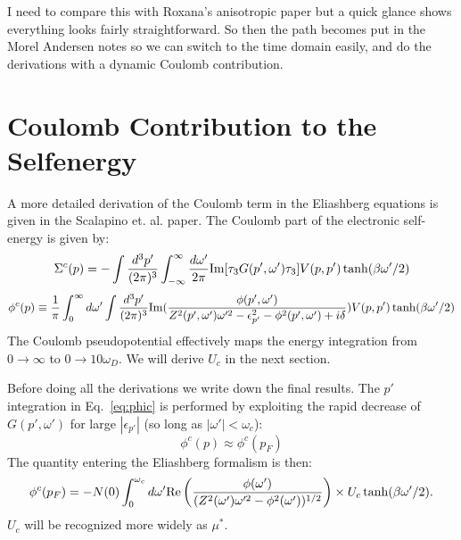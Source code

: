 I need to compare this with Roxana's anisotropic paper but a quick glance shows everything looks
fairly straightforward. So then the path becomes put in the Morel Andersen notes so we can switch
to the time domain easily, and do the derivations with a dynamic Coulomb contribution. 

\section{Coulomb Contribution to the Selfenergy}
%
A more detailed derivation of the Coulomb term in the Eliashberg equations
is given in the Scalapino et. al. paper.
%
The Coulomb part of the electronic self-energy is given by:
%
\begin{equation}
\Sigma^{c}(p) = - \int \frac{d^{3}p'}{(2\pi)^{3}}\int_{-\infty}^{\infty}\frac{d\omega'}{2\pi}{\rm Im}[\tau_{3}G(p',\omega')\tau_{3}] V(p,p')\tanh(\beta\omega'/2)
\end{equation}
%
\begin{equation}
\label{eq:phic}
\phi^{c}(p)\equiv \frac{1}{\pi}\int_{0}^{\infty}d\omega'\int\frac{d^{3}p'}{(2\pi)^{3}}
{\rm Im}(\frac{\phi(p',\omega')}{Z^{2}(p',\omega')\omega'^{2} -\epsilon^{2}_{p'}-\phi^{2}(p',\omega')+i\delta})
V(p,p') \tanh(\beta\omega'/2)
\end{equation}
%
The Coulomb pseudopotential effectively maps the energy integration from
$0\rightarrow \infty$ to $0 \rightarrow 10 \omega_{D}$. We will derive $U_{c}$ in
the next section.

Before doing all the derivations we write down the final results. The $p'$ integration in
Eq.~\ref{eq:phic} is performed by exploiting the rapid decrease of $G(p',\omega')$ 
for large $|\epsilon_{p'}|$ (so long as $|\omega'|<\omega_{c}$):
%
\begin{equation}
\phi^{c}(p) \approx \phi^{c}(p_{F})
\end{equation}
%
The quantity entering the Eliashberg formalism is then:
\begin{eqnarray}
\phi^{c}(p_{F}) =  -N(0) \int_{0}^{\omega_{c}}d\omega' {\rm Re}\left(\frac{\phi(\omega')}{(Z^{2}(\omega')\omega'^{2} - \phi^{2}(\omega'))^{1/2}}\right)
\times U_{c} \tanh(\beta\omega'/2).
\end{eqnarray}
%
$U_{c}$ will be recognized more widely as $\mu^{*}$.
%
